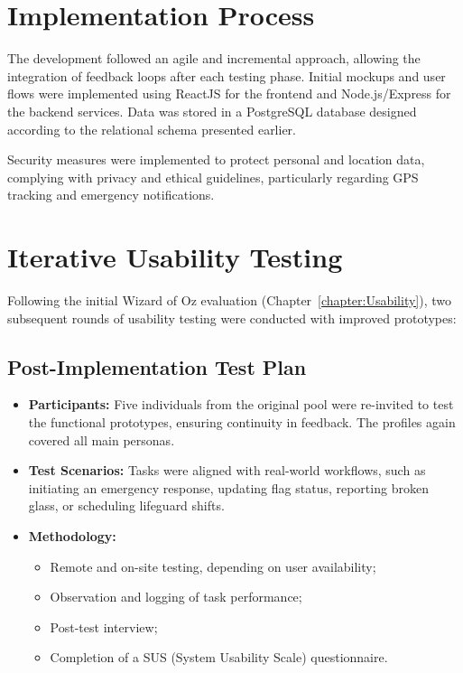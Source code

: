 \section{Implementation Process}

The development followed an agile and incremental approach, allowing the integration of feedback loops after each testing phase. Initial mockups and user flows were implemented using ReactJS for the frontend and Node.js/Express for the backend services. Data was stored in a PostgreSQL database designed according to the relational schema presented earlier.

Security measures were implemented to protect personal and location data, complying with privacy and ethical guidelines, particularly regarding GPS tracking and emergency notifications.

\section{Iterative Usability Testing}

Following the initial Wizard of Oz evaluation (Chapter~\ref{chapter:Usability}), two subsequent rounds of usability testing were conducted with improved prototypes:

\subsection{Post-Implementation Test Plan}

\begin{itemize}
    \item \textbf{Participants:} Five individuals from the original pool were re-invited to test the functional prototypes, ensuring continuity in feedback. The profiles again covered all main personas.

    \item \textbf{Test Scenarios:} Tasks were aligned with real-world workflows, such as initiating an emergency response, updating flag status, reporting broken glass, or scheduling lifeguard shifts.

    \item \textbf{Methodology:} 
    \begin{itemize}
        \item Remote and on-site testing, depending on user availability;
        \item Observation and logging of task performance;
        \item Post-test interview;
        \item Completion of a SUS (System Usability Scale) questionnaire.
    \end{itemize}
\end{itemize}

